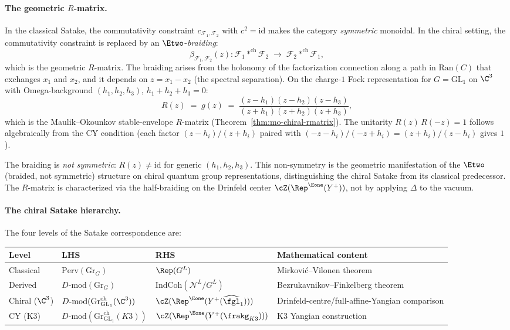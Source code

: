 \paragraph{The geometric \texorpdfstring{$R$}{R}-matrix.}
In the classical Satake, the commutativity constraint $c_{\mathcal{F}_1, \mathcal{F}_2}$ with $c^2 = \mathrm{id}$ makes the category \emph{symmetric} monoidal.
In the chiral setting, the commutativity constraint is replaced by an $\Etwo$-\emph{braiding}:
\[
 \beta_{\mathcal{F}_1, \mathcal{F}_2}(z) \colon \mathcal{F}_1 *^{\mathrm{ch}} \mathcal{F}_2 \;\longrightarrow\; \mathcal{F}_2 *^{\mathrm{ch}} \mathcal{F}_1,
\]
which is the geometric $R$-matrix.
The braiding arises from the holonomy of the factorization connection along a path in $\mathrm{Ran}(C)$ that exchanges $x_1$ and $x_2$, and it depends on $z = x_1 - x_2$ (the spectral separation).
On the charge-$1$ Fock representation for $G = \mathrm{GL}_1$ on $\C^3$ with Omega-background $(h_1, h_2, h_3)$, $h_1 + h_2 + h_3 = 0$:
\[
 R(z) \;=\; g(z) \;=\; \frac{(z - h_1)(z - h_2)(z - h_3)}{(z + h_1)(z + h_2)(z + h_3)},
\]
which is the Maulik--Okounkov stable-envelope $R$-matrix (Theorem~\ref{thm:mo-chiral-rmatrix}).
The unitarity $R(z)\,R(-z) = 1$ follows algebraically from the CY condition (each factor $(z-h_i)/(z+h_i)$ paired with $(-z-h_i)/(-z+h_i) = (z+h_i)/(z-h_i)$ gives $1$).

The braiding is \emph{not symmetric}: $R(z) \neq \mathrm{id}$ for generic $(h_1, h_2, h_3)$.
This non-symmetry is the geometric manifestation of the $\Etwo$ (braided, not symmetric) structure on chiral quantum group representations, distinguishing the chiral Satake from its classical predecessor.
The $R$-matrix is characterized via the half-braiding on the Drinfeld center $\cZ(\Rep^{\Eone}(Y^+))$, not by applying $\Delta$ to the vacuum.

\paragraph{The chiral Satake hierarchy.}
The four levels of the Satake correspondence are:
\begin{center}
\renewcommand{\arraystretch}{1.3}
\begin{tabular}{llll}
\toprule
Level & LHS & RHS & Mathematical content \\
\midrule
Classical & $\mathrm{Perv}(\mathrm{Gr}_G)$ & $\Rep(G^L)$ & Mirkovi\'c--Vilonen theorem \\
Derived & $D\text{-}\mathrm{mod}(\mathrm{Gr}_G)$ & $\mathrm{IndCoh}(\mathcal{N}^L/G^L)$ & Bezrukavnikov--Finkelberg theorem \\
Chiral ($\C^3$) & $D\text{-}\mathrm{mod}(\mathrm{Gr}^{\mathrm{ch}}_{\mathrm{GL}_1}(\C^3))$ & $\cZ(\Rep^{\Eone}(Y^+(\widehat{\fgl}_1)))$ & Drinfeld-centre/full-affine-Yangian comparison \\
CY (K3) & $D\text{-}\mathrm{mod}(\mathrm{Gr}^{\mathrm{ch}}_{\mathrm{GL}_1}(K3))$ & $\cZ(\Rep^{\Eone}(Y^+(\frakg_{K3})))$ & K3 Yangian construction \\
\bottomrule
\end{tabular}
\end{center}

